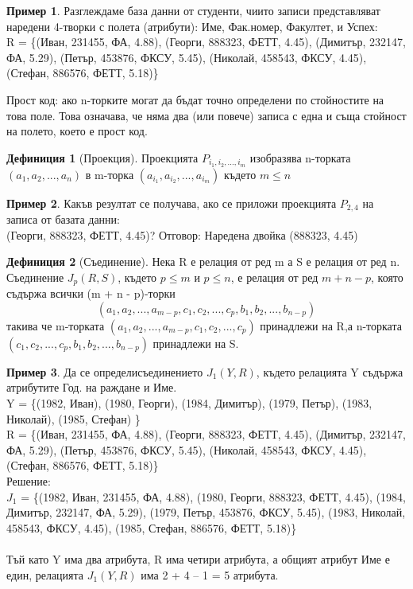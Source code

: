 \documentclass[fleqn, 12pt]{article}
\theoremstyle{definition}
\newtheorem{example}{Пример}[subsection]
\newtheorem{definition}{Дефиниция}[subsection]
\begin{document}
\begin{example}
Разглеждаме база данни от студенти, чиито записи представляват наредени 4-творки с полета (атрибути): Име, Фак.номер, Факултет, и Успех: \\
R = \{(Иван, 231455, ФА, 4.88),\;
(Георги, 888323, ФЕТТ, 4.45),\; 
(Димитър, 232147, ФА, 5.29),\;
(Петър, 453876, ФКСУ, 5.45),\;
(Николай, 458543, ФКСУ, 4.45),\;
(Стефан, 886576, ФЕТТ, 5.18)\}
\end{example}
Прост код: ако n-торките  могат да бъдат точно определени по стойностите на това поле. Това означава, че няма два (или повече) записа  с една и съща стойност на полето, което е прост код.\\

\begin{definition}[Проекция]
Проекцията $P_{i_1, i_2, ..., i_m}$ изобразява n-торката $(a_1, a_2 , ..., a_n)$ в m-торка $(a_{i_1}, a_{i_2}, ..., a_{i_m})$ където $m \leq n $
\end{definition}

\begin{example}
Какъв резултат се получава, ако се приложи проекцията $P_{2,4}$ на записа от базата данни:\\
(Георги, 888323, ФЕТТ, 4.45)?
Отговор: Наредена двойка (888323, 4.45)
\end{example}

\begin{definition}[Съединение]
Нека R е релация от ред m а S е релация от ред n. Съединение $J_p(R, S)$, където $p \leq m$ и $p \leq n$, е релация от ред $m + n - p$, която съдържа всички (m + n - p)-торки $$(a_1, a_2, ..., a_{m-p}, c_1, c_2, ..., c_p, b_1, b_2, ..., b_{n-p})$$ такива че m-торката $(a_1, a_2, ..., a_{m-p}, c_1, c_2, ..., c_p)$ принадлежи на R,а n-торката $(c_1, c_2, ..., c_p, b_1, b_2, ..., b_{n-p})$ принадлежи на S.
\end{definition}

\begin{example}
Да се определисъединението $J_1(Y, R)$, където релацията Y съдържа атрибутите Год. на раждане и Име. \\
Y = \{(1982, Иван),\;
(1980, Георги), \;
(1984, Димитър),\;
(1979, Петър),\; 
(1983, Николай),\;
(1985, Стефан) \}
\\
R = \{(Иван, 231455, ФА, 4.88),\;
(Георги, 888323, ФЕТТ, 4.45),\; 
(Димитър, 232147, ФА, 5.29),\;
(Петър, 453876, ФКСУ, 5.45),\;
(Николай, 458543, ФКСУ, 4.45),\;
(Стефан, 886576, ФЕТТ, 5.18)\} 
\\
Решение: \\
$J_1$ = \{(1982, Иван, 231455, ФА, 4.88),\;
(1980, Георги, 888323, ФЕТТ, 4.45),\;
(1984, Димитър, 232147, ФА, 5.29),\;
(1979, Петър, 453876, ФКСУ, 5.45),\;
(1983, Николай, 458543, ФКСУ, 4.45),\;
(1985, Стефан, 886576, ФЕТТ, 5.18)\} \\
\\
Тъй като Y има два атрибута, R има четири атрибута, а общият атрибут Име е един, релацията $J_1(Y, R)$ има 2 + 4 – 1 = 5 атрибута.
\end{example}
\end{document}
